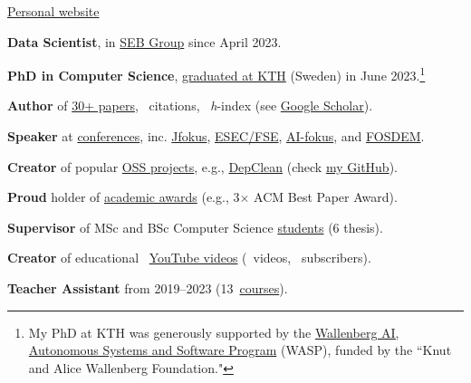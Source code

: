 \documentclass{files/CV/cesar}
\begin{document}


\ybPrintPhoto{}

{\scshape\bfseries\Large {}}

 \href{https://www.cesarsotovalero.net}{Personal website}

\onehalfspacing

\vspace{1.5em}

\textbf{Data Scientist}, in \href{https://www.linkedin.com/in/cesarsotovalero/}{SEB Group} since April 2023.

\textbf{PhD in Computer Science}, \href{https://kth.diva-portal.org/smash/record.jsf?pid=diva2%3A1755964&dswid=5947}{graduated at KTH} (Sweden) in June 2023.\footnote[1]{My PhD at KTH was generously supported by the \href{https://wasp-sweden.org/}{Wallenberg AI, Autonomous Systems and Software Program} (WASP), funded by the ``Knut and Alice Wallenberg Foundation."}

\textbf{Author} of \href{https://www.cesarsotovalero.net/publications}{30+ papers}, \citations~citations, \hindex~\emph{h}-index (see \href{https://scholar.google.es/citations?user=jNBoowwAAAAJ&hl=en}{Google Scholar}).

\textbf{Speaker} at \href{https://www.cesarsotovalero.net/talks}{conferences}, inc.
  \href{https://youtu.be/Xn1ShZPrw2o?si=TFJIJjrmGg5CzxZm}{Jfokus},
  \href{https://youtu.be/cePEl485E_s}{ESEC/FSE},
  \href{https://youtu.be/kFPE9EcxhCs}{AI-fokus}, and
  \href{https://youtu.be/8SndbPMwdWE}{FOSDEM}.

\textbf{Creator} of popular \href{https://www.cesarsotovalero.net/software}{OSS projects}, e.g., \href{https://github.com/castor-software/depclean}{DepClean} (check \href{https://github.com/cesarsotovalero}{my GitHub}).

\textbf{Proud} holder of \href{https://www.cesarsotovalero.net/awards}{academic awards} (e.g., 3$\times$ ACM Best Paper Award).

\textbf{Supervisor} of MSc and BSc Computer Science \href{hhttps://www.cesarsotovalero.net/service#thesis-supervisor}{students} (6 thesis).

\textbf{Creator} of educational ~\href{https://www.youtube.com/@cesarsotovalero}{YouTube videos} (\youtubevideos~videos, \ytSubscribers~subscribers).

\textbf{Teacher Assistant} from 2019--2023 (13~\href{https://www.cesarsotovalero.net/service#teaching}{courses}).
\end{document}

